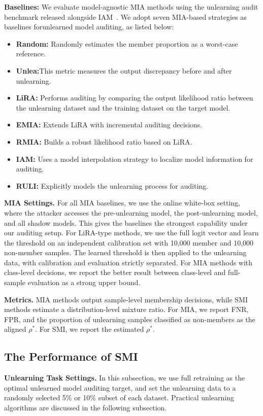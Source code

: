 \documentclass{article}
\theoremstyle{plain}
\theoremstyle{definition}
\theoremstyle{remark}
\begin{document}
\textbf{Baselines:} We evaluate model-agnostic MIA methods using the unlearning audit benchmark released alongside IAM~\cite{IAM}. We adopt seven MIA-based strategies as baselines forunlearned model auditing, as listed below:
\begin{itemize}
\item \textbf{Random:} Randomly estimates the member proportion as a worst-case reference.
\item \textbf{Unlea:}This metric measures the output discrepancy before and after unlearning.
    \item \textbf{LiRA:} Performs auditing by comparing the output likelihood ratio between the unlearning dataset and the training dataset on the target model.
    \item \textbf{EMIA:} Extends LiRA with incremental auditing decisions.
    \item \textbf{RMIA:} Builds a robust likelihood ratio based on LiRA.
    \item \textbf{IAM:} Uses a model interpolation strategy to localize model information for auditing.
    \item \textbf{RULI:} Explicitly models the unlearning process for auditing.
\end{itemize}

\textbf{MIA Settings.} For all MIA baselines, we use the online white-box setting, where the attacker accesses the pre-unlearning model, the post-unlearning model, and all shadow models. This gives the baselines the strongest capability under our auditing setup. For LiRA-type methods, we use the full logit vector and learn the threshold on an independent calibration set with 10,000 member and 10,000 non-member samples. The learned threshold is then applied to the unlearning data, with calibration and evaluation strictly separated. For MIA methods with class-level decisions, we report the better result between class-level and full-sample evaluation as a strong upper bound.


\textbf{Metrics.} MIA methods output sample-level membership decisions, while SMI methods estimate a distribution-level mixture ratio. For MIA, we report FNR, FPR, and the proportion of unlearning samples classified as non-members as the aligned $\rho^*$. For SMI, we report the estimated $\rho^*$.

\subsection{The Performance of SMI}
\textbf{Unlearning Task Settings.} In this subsection, we use full retraining as the optimal unlearned model auditing target, and set the unlearning data to a randomly selected 5\% or 10\% subset of each dataset. Practical unlearning algorithms are discussed in the following subsection.
\end{document}
